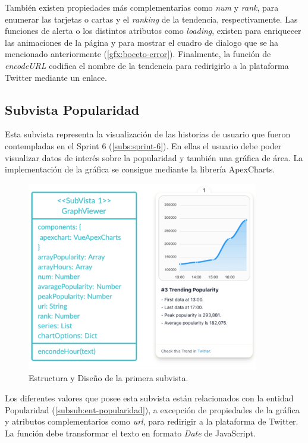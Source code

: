 \vspace{0.3cm}

También existen propiedades más complementarias como \textit{num} y \textit{rank}, para enumerar las tarjetas o cartas y el \textit{ranking} de la tendencia, respectivamente. Las funciones de alerta o los distintos atributos como \textit{loading}, existen para enriquecer las animaciones de la página y para mostrar el cuadro de dialogo que se ha mencionado anteriormente (\ref{gfx:boceto-error}). Finalmente, la función de \textit{encodeURL} codifica el nombre de la tendencia para redirigirlo a la plataforma Twitter mediante un enlace.

\subsection{Subvista Popularidad}\label{subs:vista-popu}
Esta subvista representa la visualización de las historias de usuario que fueron contempladas en el Sprint 6 (\ref{subs:sprint-6}). En ellas el usuario debe poder visualizar datos de interés sobre la popularidad y también una gráfica de área. La implementación de la gráfica se consigue mediante la librería ApexCharts.

\begin{figure}[H]
    \centering
    \myfloatalign
    \includegraphics[width=0.9\textwidth]{gfx/subvista1.png}
    \caption[Estructura y Diseño de la primera subvista]{Estructura y Diseño de la primera subvista.}\label{gfx:subvista1}
\end{figure}

Los diferentes valores que posee esta subvista están relacionados con la entidad Popularidad (\ref{subsub:ent-popularidad}), a excepción de propiedades de la gráfica y atributos complementarios como \textit{url}, para redirigir a la plataforma de Twitter. La función debe transformar el texto en formato \textit{Date} de JavaScript.

